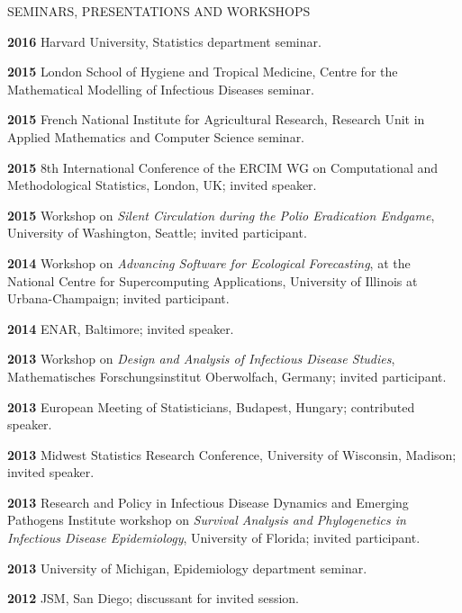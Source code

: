 \begin{mylist}{SEMINARS, PRESENTATIONS AND WORKSHOPS}
\item{\bf 2016 } Harvard University, Statistics department seminar.

\item{\bf 2015 } London School of Hygiene and Tropical Medicine, Centre for the Mathematical Modelling of Infectious Diseases seminar.

\item{\bf 2015 } French National Institute for Agricultural Research, Research Unit in Applied Mathematics and Computer Science seminar.

\item{\bf 2015 } 8th International Conference of the ERCIM WG on Computational and Methodological Statistics, London, UK; invited speaker.

\item{\bf 2015 } Workshop on {\it Silent Circulation during the Polio Eradication Endgame}, University of Washington, Seattle; invited participant. 

\item{\bf 2014 } Workshop on {\it Advancing Software for Ecological Forecasting}, at the National Centre for Supercomputing Applications, University of Illinois at Urbana-Champaign; invited participant.

\item{\bf 2014 } ENAR, Baltimore; invited speaker.

\item{\bf 2013 }  Workshop on {\it Design and Analysis of Infectious Disease Studies}, Mathematisches Forschungsinstitut Oberwolfach, Germany; invited participant.

\item{\bf 2013 } European Meeting of Statisticians, Budapest, Hungary; contributed speaker.

\item{\bf 2013 } Midwest Statistics Research Conference, University of Wisconsin, Madison;  invited speaker.

\item{\bf 2013 }  Research and Policy in Infectious Disease Dynamics and Emerging Pathogens Institute workshop on {\it Survival Analysis and Phylogenetics in Infectious Disease Epidemiology}, University of Florida; invited participant.

\item{\bf 2013 } University of Michigan, Epidemiology department seminar.

\item{\bf 2012 } JSM, San Diego; discussant for invited session.


\end{mylist}
